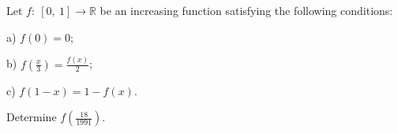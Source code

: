 Let $f: \ [0,\ 1] \rightarrow \mathbb{R}$ be an increasing function satisfying the following conditions:

a) $f(0)=0$;

b) $f\left(\frac{x}{3}\right)=\frac{f(x)}{2}$;

c) $f(1-x)=1-f(x)$.

Determine $f\left(\frac{18}{1991}\right)$.